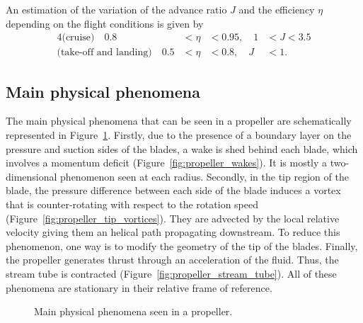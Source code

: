 An estimation of the variation of the advance ratio $J$ and the 
efficiency $\eta$ depending on the flight conditions is 
given by~\citet{Bousquet2012}
\begin{alignat}{4}
    \text{(cruise)} \quad  0.8 &< \eta &< 0.95, \quad 1 &< J < 3.5 \\
    \text{(take-off and landing)} \quad  0.5 &< \eta &< 0.8, \quad J &< 1.
    \label{eq:estimation_sim_coeff}
\end{alignat}

\subsection{Main physical phenomena}
\label{sub:cror_propeller_physics}

The main physical phenomena that can be seen in a propeller are schematically represented
in Figure~\ref{fig:propeller_phys_phenomena}. Firstly, due to the presence of a boundary
layer on the pressure and suction sides of the blades, a wake is shed behind each blade, which involves a momentum deficit (Figure~\ref{fig:propeller_wakes}). 
It is mostly a two-dimensional
phenomenon seen at each radius. Secondly, 
in the tip region of the blade, the pressure difference between each 
side of the blade induces a vortex that is counter-rotating with respect to 
the rotation speed (Figure~\ref{fig:propeller_tip_vortices}). 
They are advected by the local relative velocity giving them
an helical path propagating downstream.
To reduce this phenomenon, one way is to modify the geometry of the tip
of the blades.
Finally, the propeller generates thrust through an acceleration of the fluid. Thus, the stream
tube is contracted (Figure~\ref{fig:propeller_stream_tube}). 
All of these phenomena are stationary in their relative frame of reference.
\begin{figure}[htp]
  \centering
  \quad{}
  \quad{}
  \caption{Main physical phenomena seen in a propeller.}
  \label{fig:propeller_phys_phenomena}
\end{figure}
